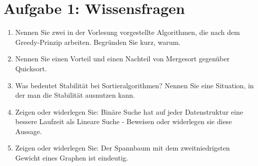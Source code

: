 \documentclass{scrartcl}
\begin{document}
\section*{Aufgabe 1: Wissensfragen}
\begin{enumerate}[(1)]
\item Nennen Sie zwei in der Vorlesung vorgestellte Algorithmen, die nach dem Greedy-Prinzip arbeiten. Begründen Sie kurz, warum.

\item Nennen Sie einen Vorteil und einen Nachteil von Mergesort gegenüber Quicksort.

\item Was bedeutet Stabilität bei Sortieralgorithmen? Nennen Sie eine Situation, in der man die Stabilität ausnutzen kann.

\item Zeigen oder widerlegen Sie: Bin\"are Suche hat auf jeder Datenstruktur eine bessere Laufzeit als Lineare Suche - Beweisen oder widerlegen sie diese Aussage.

\item Zeigen oder widerlegen Sie: Der Spannbaum mit dem zweitniedrigsten Gewicht eines Graphen ist eindeutig. 
\end{enumerate}
\end{document}
